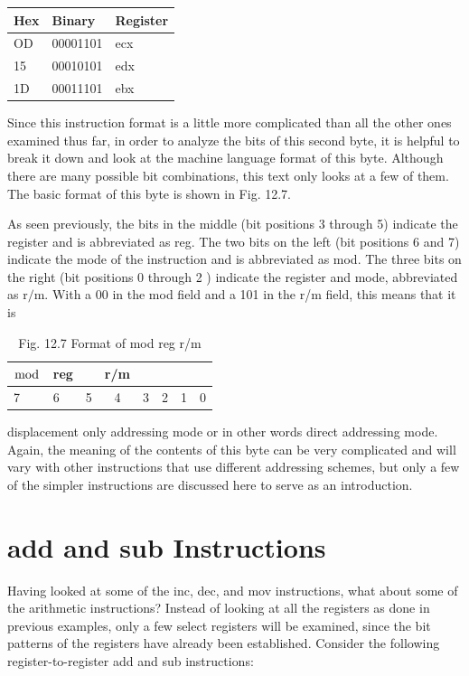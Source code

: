\documentclass[10pt]{book}
\begin{document}
\begin{center}
\begin{tabular}{|l|l|l|}
\hline
Hex & Binary & Register \\
\hline
OD & 00001101 & ecx \\
\hline
15 & 00010101 & edx \\
\hline
1D & 00011101 & ebx \\
\hline
\end{tabular}
\end{center}

Since this instruction format is a little more complicated than all the other ones examined thus far, in order to analyze the bits of this second byte, it is helpful to break it down and look at the machine language format of this byte. Although there are many possible bit combinations, this text only looks at a few of them. The basic format of this byte is shown in Fig. 12.7.

As seen previously, the bits in the middle (bit positions 3 through 5) indicate the register and is abbreviated as reg. The two bits on the left (bit positions 6 and 7) indicate the mode of the instruction and is abbreviated as mod. The three bits on the right (bit positions 0 through 2 ) indicate the register and mode, abbreviated as $\mathrm{r} / \mathrm{m}$. With a 00 in the mod field and a 101 in the r/m field, this means that it is

\begin{table}[htbp]
\begin{center}
\begin{tabular}{|ll|lcllll|}
\hline
$\bmod$ & reg &  & r/m &  &  &  &  \\
\hline
7 & 6 & 5 & 4 & 3 & 2 & 1 & 0 \\
\hline
\end{tabular}
\captionsetup{labelformat=empty}
\caption{Fig. 12.7 Format of mod reg r/m}
\end{center}
\end{table}

displacement only addressing mode or in other words direct addressing mode. Again, the meaning of the contents of this byte can be very complicated and will vary with other instructions that use different addressing schemes, but only a few of the simpler instructions are discussed here to serve as an introduction.

\section{add and sub Instructions}
Having looked at some of the inc, dec, and mov instructions, what about some of the arithmetic instructions? Instead of looking at all the registers as done in previous examples, only a few select registers will be examined, since the bit patterns of the registers have already been established. Consider the following register-to-register add and sub instructions:
\end{document}

